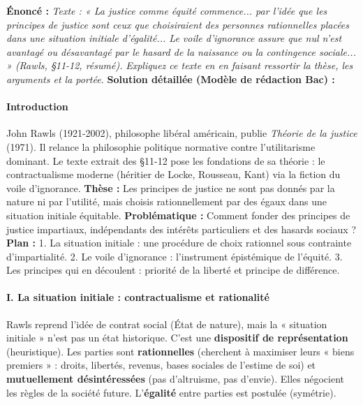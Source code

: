 \documentclass[11pt]{article}
\newcommand{\cle}[1]{{\popxbold\color{popdark}#1}}
\begin{document}
\begin{exoresolu}
    \textbf{Énoncé :} \textit{Texte : « La justice comme équité commence... par l'idée que les principes de justice sont ceux que choisiraient des personnes rationnelles placées dans une situation initiale d'égalité... Le voile d'ignorance assure que nul n'est avantagé ou désavantagé par le hasard de la naissance ou la contingence sociale... » (Rawls, §11-12, résumé).}
    \textit{Expliquez ce texte en en faisant ressortir la thèse, les arguments et la portée.}
    \tcblower
    \textbf{Solution détaillée (Modèle de rédaction Bac) :}
    \paragraph{Introduction}
    John Rawls (1921-2002), philosophe libéral américain, publie \emph{Théorie de la justice} (1971). Il relance la philosophie politique normative contre l'utilitarisme dominant. Le texte extrait des §11-12 pose les fondations de sa théorie : le \cle{contractualisme} moderne (héritier de Locke, Rousseau, Kant) via la fiction du \cle{voile d'ignorance}.
    \textbf{Thèse :} Les principes de justice ne sont pas donnés par la nature ni par l'utilité, mais choisis rationnellement par des égaux dans une situation initiale équitable.
    \textbf{Problématique :} Comment fonder des principes de justice impartiaux, indépendants des intérêts particuliers et des hasards sociaux ?
    \textbf{Plan :} 1. La situation initiale : une procédure de choix rationnel sous contrainte d'impartialité. 2. Le voile d'ignorance : l'instrument épistémique de l'équité. 3. Les principes qui en découlent : priorité de la liberté et principe de différence.
    \paragraph{I. La situation initiale : contractualisme et rationalité}
    Rawls reprend l'idée de \cle{contrat social} (État de nature), mais la « situation initiale » n'est pas un état historique. C'est une \textbf{dispositif de représentation} (heuristique). Les parties sont \textbf{rationnelles} (cherchent à maximiser leurs « biens premiers » : droits, libertés, revenus, bases sociales de l'estime de soi) et \textbf{mutuellement désintéressées} (pas d'altruisme, pas d'envie). Elles négocient les règles de la société future. L'\textbf{égalité} entre parties est postulée (symétrie).

\end{exoresolu}
\end{document}
